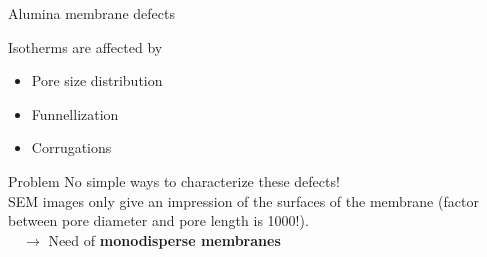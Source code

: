 \documentclass{beamer}
\begin{document}
  \begin{frame}{Alumina membrane defects}
    \begin{block}{Isotherms are affected by}
      \begin{itemize}
        \item Pore size distribution
        \item Funnellization
        \item Corrugations
      \end{itemize}
    \end{block}
    \pause

    \begin{alertblock}{Problem}
      No simple ways to characterize these defects!\\
      SEM images only give an impression of the surfaces of the membrane (factor between pore diameter and pore length is 1000!).\\
      $\quad\rightarrow$ Need of \textbf{monodisperse membranes}
    \end{alertblock}
  \end{frame}
\end{document}
